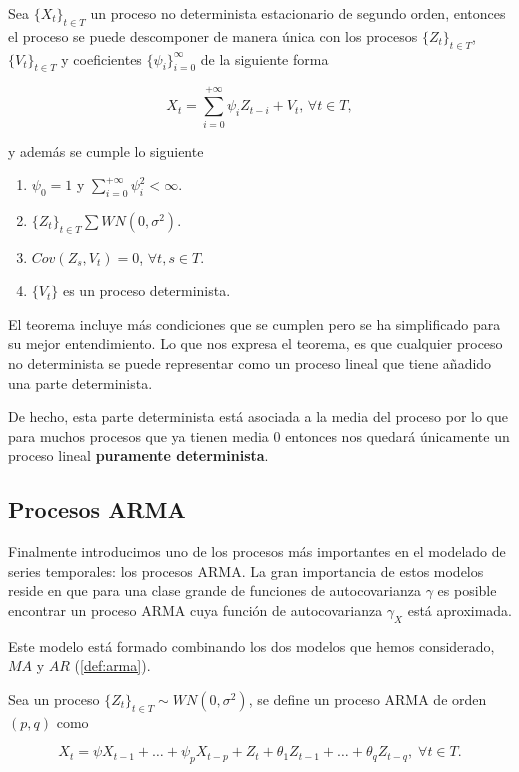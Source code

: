 \begin{teorema}
  Sea $\{X_t\}_{t \in T}$ un proceso no determinista estacionario de segundo orden, entonces el proceso se puede descomponer de manera única con los procesos $\{Z_t\}_{t \in T}$, $\{V_t\}_{t \in T}$ y coeficientes $\{\psi_i\}_{i = 0}^{\infty}$ de la siguiente forma

  $$ X_t = \sum \limits^{+\infty}_{i = 0} \psi_i Z_{t - i} + V_t, \, \forall t \in T,$$

  y además se cumple lo siguiente

  \begin{enumerate}
    \item $\psi_0 = 1$ y $\sum^{+\infty}_{i = 0} \psi^2_i < \infty$.
    \item $\{Z_t\}_{t \in T} \sum WN(0, \sigma^2)$.
    \item $Cov(Z_s, V_t) = 0$, $\forall t,s \in T$.
    \item $\{V_t\}$ es un proceso determinista.
  \end{enumerate}
  \label{th:wold}
\end{teorema}

El teorema incluye más condiciones que se cumplen pero se ha simplificado para su mejor entendimiento. Lo que nos expresa el teorema, es que cualquier proceso no determinista se puede representar como un proceso lineal que tiene añadido una parte determinista.

De hecho, esta parte determinista está asociada a la media del proceso por lo que para muchos procesos que ya tienen media 0 entonces nos quedará únicamente un proceso lineal \textbf{puramente determinista}.

\subsection{Procesos ARMA}

Finalmente introducimos uno de los procesos más importantes en el modelado de series temporales: los procesos ARMA. La gran importancia de estos modelos reside en que para una clase grande de funciones de autocovarianza $\gamma$ es posible encontrar un proceso ARMA cuya función de autocovarianza $\gamma_X$ está aproximada.

Este modelo está formado combinando los dos modelos que hemos considerado, $MA$ y $AR$ (\autoref{def:arma}).

\begin{definicion}
  Sea un proceso $\{Z_t\}_{t \in T} \sim WN(0, \sigma^2)$, se define un proceso ARMA de orden $(p, q)$ como

  $$X_t = \psi X_{t-1} + \ldots + \psi_p X_{t-p} + Z_t + \theta_1 Z_{t-1} + \ldots + \theta_q Z_{t - q}, \; \forall t \in T.$$
\label{def:arma}
\end{definicion}


